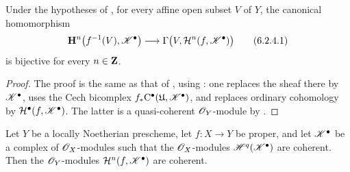 \begin{corollary}[6.2.4]
\label{III.6.2.4}
Under the hypotheses of , for every affine open
subset $V$ of $Y$, the canonical homomorphism
\[
  \mathbf{H}^n\bigl(f^{-1}(V),\mathscr{K}^\bullet\bigr)
  \longrightarrow
  \Gamma\bigl(V,\mathcal{H}^n(f,\mathscr{K}^\bullet)\bigr)
  \tag{6.2.4.1}\label{III.6.2.4.1}
\]
is bijective for every $n\in\mathbf{Z}$.
\end{corollary}

\begin{proof}
The proof is the same as that of , using
: one replaces the sheaf there by
$\mathscr{K}^\bullet$, uses the Cech bicomplex
$f_*\mathrm{C}^\bullet(\mathfrak{U},\mathscr{K}^\bullet)$, and replaces
ordinary cohomology by
$\mathcal{H}^\bullet(f,\mathscr{K}^\bullet)$.  The latter is a
quasi-coherent $\mathscr{O}_Y$-module by .
\end{proof}

\begin{proposition}[6.2.5]
\label{III.6.2.5}
Let $Y$ be a locally Noetherian prescheme, let $f:X\to Y$ be
proper, and let $\mathscr{K}^\bullet$ be a complex of
$\mathscr{O}_X$-modules such that the $\mathscr{O}_X$-modules
$\mathscr{H}^q(\mathscr{K}^\bullet)$ are coherent.  Then the
$\mathscr{O}_Y$-modules $\mathcal{H}^n(f,\mathscr{K}^\bullet)$ are
coherent.
\end{proposition}

